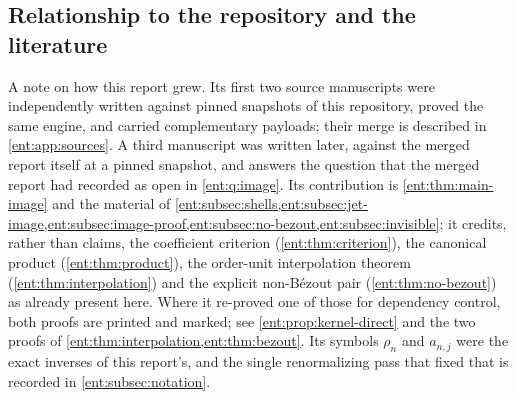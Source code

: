 \documentclass[11pt]{article}
\theoremstyle{plain}
\theoremstyle{plain}
\theoremstyle{plain}
\theoremstyle{definition}
\theoremstyle{definition}
\theoremstyle{definition}
\theoremstyle{definition}
\theoremstyle{remark}
\begin{document}
\subsection{Relationship to the repository and the literature}
\label{ent:subsec:repo}
A note on how this report grew. Its first two source manuscripts were
independently written against pinned snapshots of this repository, proved the
same engine, and carried complementary payloads; their merge is described in
\cref{ent:app:sources}. A third manuscript was written later, against the
merged report itself at a pinned snapshot, and answers the question that the
merged report had recorded as open in \cref{ent:q:image}. Its contribution is
\cref{ent:thm:main-image} and the material of
\cref{ent:subsec:shells,ent:subsec:jet-image,ent:subsec:image-proof,ent:subsec:no-bezout,ent:subsec:invisible};
it credits, rather than claims, the coefficient criterion
(\cref{ent:thm:criterion}), the canonical product
(\cref{ent:thm:product}), the order-unit interpolation theorem
(\cref{ent:thm:interpolation}) and the explicit non-B\'ezout pair
(\cref{ent:thm:no-bezout}) as already present here. Where it re-proved one of
those for dependency control, both proofs are printed and marked; see
\cref{ent:prop:kernel-direct} and the two proofs of
\cref{ent:thm:interpolation,ent:thm:bezout}. Its symbols $\rho_n$ and
$a_{n,j}$ were the exact inverses of this report's, and the single
renormalizing pass that fixed that is recorded in
\cref{ent:subsec:notation}.
\end{document}
